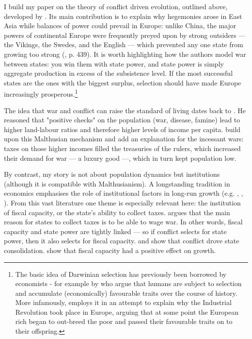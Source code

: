 \documentclass[11pt, a4paper]{article}
\begin{document}
I build my paper on the theory of conflict driven evolution, outlined above, developed by \cite{levine2013, levine2021, levine2022}. Its main contribution is to explain why hegemonies arose in East Asia while balances of power could prevail in Europe: unlike China, the major powers of continental Europe were frequently preyed upon by strong outsiders --- the Vikings, the Swedes, and the English --- which prevented any one state from growing too strong (\citealp{levine2021}, p. 439). It is worth highlighting how the authors model war between states: you win them with state power, and state power is simply aggregate production in excess of the subsistence level. If the most successful states are the ones with the biggest surplus, selection should have made Europe increasingly prosperous.\footnote
{
The basic idea of Darwinian selection has previously been borrowed by economists - for example by \cite{galor2002} who argue that humans are subject to selection and accumulate (economically) favourable traits over the course of history. More infamously, \cite{clark2007} employs it in an attempt to explain why the Industrial Revolution took place in Europe, arguing that at some point the European rich began to out-breed the poor and passed their favourable traits on to their offspring.
}

The idea that war and conflict can raise the standard of living dates back to \cite{malthus1798}. He reasoned that "positive checks" on the population (war, disease, famine) lead to higher land-labour ratios and therefore higher levels of income per capita. \cite{voigtlnder2013} build upon this Malthusian mechanism and add an explanation for the incessant wars: taxes on those higher incomes filled the treasuries of the rulers, which increased their demand for war --- a luxury good ---, which in turn kept population low. 

By contrast, my story is not about population dynamics but institutions (although it is compatible with Malthusianism). A longstanding tradition in economics emphasises the role of institutional factors in long-run growth (e.g. \cite{north1970}, \cite{delong1993}, \cite{ajr2001}). From this vast literature one theme is especially relevant here: the institution of fiscal capacity, or the state's ability to collect taxes. \cite{tilly1985} argues that the main reason for states to collect taxes is to be able to wage war. In other words, fiscal capacity and state power are tightly linked --- so if conflict selects for state power, then it also selects for fiscal capacity. \cite{gennaioli2015} and \cite{cantoni2023} show that conflict drove state consolidation. \cite{dincecco2012} show that fiscal capacity had a positive effect on growth.
\end{document}
